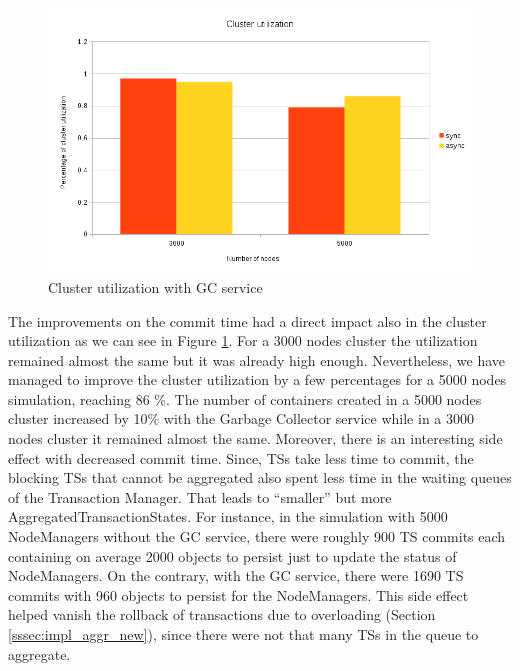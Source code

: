 \begin{figure}
\centering
\includegraphics[scale=0.7]{resources/images/Evaluation/cluster_util_sync_async.png}
\caption{Cluster utilization with GC service}
\label{fig:ev_cluster_util_sync_async}
\end{figure}

The improvements on the commit time had a direct impact also in the
cluster utilization as we can see in Figure
\ref{fig:ev_cluster_util_sync_async}. For a 3000 nodes cluster the
utilization remained almost the same but it was already high
enough. Nevertheless, we have managed to improve the cluster
utilization by a few percentages for a 5000 nodes simulation, reaching
86 $\%$. The number of containers created in a 5000 nodes cluster
increased by 10$\%$ with the Garbage Collector service while in a 3000
nodes cluster it remained almost the same. Moreover, there is an interesting
side effect with decreased commit time. Since, TSs take less time to
commit, the blocking TSs that cannot be aggregated also spent less
time in the waiting queues of the Transaction Manager. That leads to
``smaller'' but more AggregatedTransactionStates. For instance, in the
simulation with 5000 NodeManagers without the GC service, there were
roughly 900 TS commits each containing on average 2000 objects to persist just
to update the status of NodeManagers. On the contrary, with the GC
service, there were 1690 TS commits with 960 objects to persist for
the NodeManagers. This side effect helped vanish the rollback of
transactions due to overloading (Section \ref{sssec:impl_aggr_new}), 
since there were not that many TSs in the queue to aggregate.